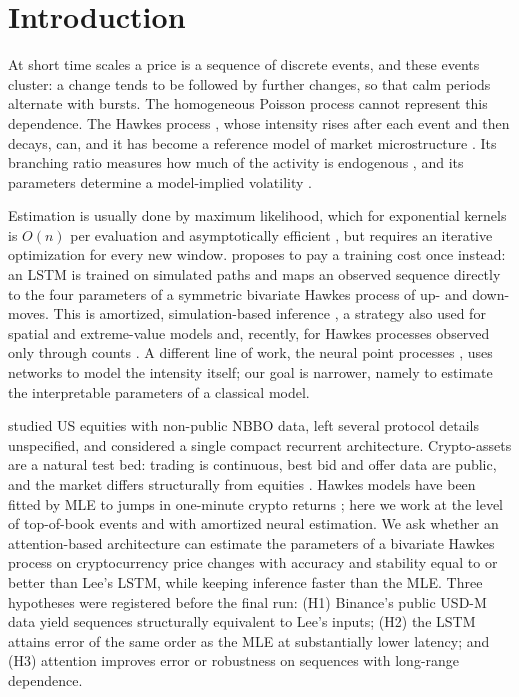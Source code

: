 \documentclass[preprint,12pt,authoryear]{elsarticle}
\begin{document}
\section{Introduction}
\label{sec:intro}

At short time scales a price is a sequence of discrete events, and these events cluster:
a change tends to be followed by further changes, so that calm periods alternate with
bursts. The homogeneous Poisson process cannot represent this dependence. The Hawkes
process \citep{hawkes1971,hawkes1971b}, whose intensity rises after each event and then
decays, can, and it has become a reference model of market microstructure
\citep{bowsher2007,bacry2013,bacry2015,hawkes2018}. Its branching ratio measures how much of
the activity is endogenous \citep{filimonov2012,hardiman2013}, and its parameters determine
a model-implied volatility \citep{leeseo2017,lee2024}.

Estimation is usually done by maximum likelihood, which for exponential kernels is
$O(n)$ per evaluation \citep{ozaki1979} and asymptotically efficient \citep{ogata1978},
but requires an iterative optimization for every new window. \citet{lee2023} proposes to
pay a training cost once instead: an LSTM is trained on simulated paths and maps an observed
sequence directly to the four parameters of a symmetric bivariate Hawkes process of up- and
down-moves. This is amortized, simulation-based inference \citep{cranmer2020}, a strategy
also used for spatial and extreme-value models \citep{gerber2021,lenzi2023} and, recently,
for Hawkes processes observed only through counts \citep{lambe2025}. A different line of
work, the neural point processes \citep{du2016,mei2017,zuo2020,zhang2020,shchur2021}, uses
networks to model the intensity itself; our goal is narrower, namely to estimate the
interpretable parameters of a classical model.

\citet{lee2023} studied US equities with non-public NBBO data, left several protocol details
unspecified, and considered a single compact recurrent architecture. Crypto-assets are a
natural test bed: trading is continuous, best bid and offer data are public, and the market
differs structurally from equities \citep{makarov2020,he2022perpetual}. Hawkes models have
been fitted by MLE to jumps in one-minute crypto returns \citep{taddeo2024}; here we work at
the level of top-of-book events and with amortized neural estimation. We ask whether an
attention-based architecture can estimate the parameters of a bivariate Hawkes process on
cryptocurrency price changes with accuracy and stability equal to or better than Lee's LSTM,
while keeping inference faster than the MLE. Three hypotheses were registered before the
final run: (H1) Binance's public USD-M data yield sequences structurally equivalent to
Lee's inputs; (H2) the LSTM attains error of the same order as the MLE at substantially
lower latency; and (H3) attention improves error or robustness on sequences with
long-range dependence.
\end{document}
